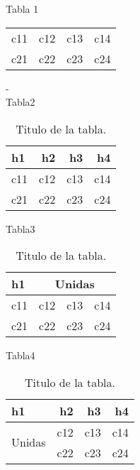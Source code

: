 \documentclass{article}
\begin{document}
Tabla 1\\
\begin{tabular}{llcr}
c11 & c12 & c13 & c14 \\
c21 & c22 & c23 & c24 \\
\end{tabular}

-\\

Tabla2\\
\begin{table}[htbp]
  \begin{center}
  \caption{Titulo de la tabla.}
  \label{tabla:tab2}
  \begin{tabular}{|l|rrr|}
    \hline
    h1 & h2 & h3 & h4 \\
    \hline
    c11 & c12 & c13 & c14 \\
    c21 & c22 & c23 & c24 \\
    \hline
  \end{tabular}
  \end{center}
\end{table}

Tabla3\\
\begin{table}[htbp]
  \begin{center}
  \caption{Titulo de la tabla.}
  \label{tabla:tab3}
  \begin{tabular}{|l|rrr|}
    \hline
    h1 & \multicolumn{3}{|c|}{Unidas} \\
    \hline
    c11 & c12 & c13 & c14 \\
    c21 & c22 & c23 & c24 \\
    \hline
  \end{tabular}
  \end{center}
\end{table}

Tabla4\\
\begin{table}[htbp]
  \begin{center}
  \caption{Titulo de la tabla.}
  \label{tabla:tab4}
  \begin{tabular}{|l|rrr|}
    \hline
    h1 & h2 & h3 & h4 \\
    \hline
    \multirow{2}{*}{Unidas} & c12 & c13 & c14 \\
     & c22 & c23 & c24 \\
    \hline
  \end{tabular}
  \end{center}
\end{table}
\end{document}
